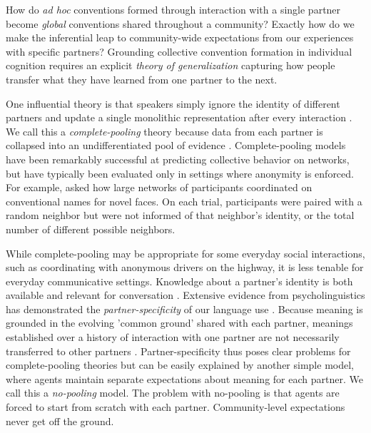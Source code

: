 
How do \emph{ad hoc} conventions formed through interaction with a single partner become \emph{global} conventions shared throughout a community?
Exactly how do we make the inferential leap to community-wide expectations from our experiences with specific partners? 
Grounding collective convention formation in individual cognition requires an explicit \emph{theory of generalization} capturing how people transfer what they have learned from one partner to the next.

One influential theory is that speakers simply ignore the identity of different partners and update a single monolithic representation after every interaction \cite{steels_self-organizing_1995,barr_establishing_2004,young_evolution_2015}.
We call this a \emph{complete-pooling} theory because data from each partner is collapsed into an undifferentiated pool of evidence \cite{gelman2006data}. 
Complete-pooling models have been remarkably successful at predicting collective behavior on networks, but have typically been evaluated only in settings where anonymity is enforced. 
For example,  asked how large networks of participants coordinated on conventional names for novel faces.
On each trial, participants were paired with a random neighbor but were not informed of that neighbor's identity, or the total number of different possible neighbors. 

While complete-pooling may be appropriate for some everyday social interactions, such as coordinating with anonymous drivers on the highway, it is less tenable for everyday communicative settings.
Knowledge about a partner's identity is both available and relevant for conversation \cite{eckert_three_2012, davidson_nice_1986}.
Extensive evidence from psycholinguistics has demonstrated the \emph{partner-specificity} of our language use \cite{clark_using_1996}. 
Because meaning is grounded in the evolving 'common ground' shared with each partner, meanings established over a history of interaction with one partner are not necessarily transferred to other partners \cite{wilkes-gibbs_coordinating_1992,metzing_when_2003,horton_revisiting_2016}.
Partner-specificity thus poses clear problems for complete-pooling theories but can be easily explained by another simple model, where agents maintain separate expectations about meaning for each partner.
We call this a \emph{no-pooling} model.
The problem with no-pooling is that agents are forced to start from scratch with each partner.
Community-level expectations never get off the ground.

